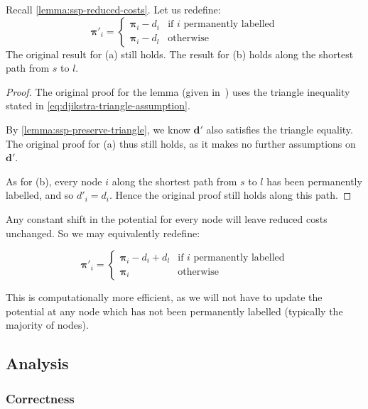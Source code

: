 \begin{lemma}
    Recall \cref{lemma:ssp-reduced-costs}. Let us redefine:
    {\normalfont
        \[\boldsymbol{\pi}'_{i}=\begin{cases}
        \boldsymbol{\pi}_{i}-d_{i} & \textrm{if $i$ permanently labelled}\\
        \boldsymbol{\pi}_{i}-d_{l} & \textrm{otherwise}
        \end{cases}\]}
    The original result for (a) still holds. The result for (b) holds along the shortest path from $s$ to $l$\footnotemark.
\end{lemma}
\begin{proof}
    The original proof for the lemma (given in~\cite[p.~320]{Ahuja:1993}) uses the triangle inequality stated in \cref{eq:djikstra-triangle-assumption}. 
    
    By \cref{lemma:ssp-preserve-triangle}, we know $\mathbf{d}'$ also satisfies the triangle equality. The original proof for (a) thus still holds, as it makes no further assumptions on $\mathbf{d}'$.
    
    As for (b), every node $i$ along the shortest path from $s$ to $l$ has been permanently labelled, and so $d'_i = d_i$. Hence the original proof still holds along this path.
\end{proof}

Any constant shift in the potential for every node will leave reduced costs unchanged. So we may equivalently redefine:

\[\boldsymbol{\pi}'_{i}=\begin{cases}
\boldsymbol{\pi}_{i}-d_i+d_l & \text{if $i$ permanently labelled}\\
\boldsymbol{\pi}_{i} & \text{otherwise}
\end{cases}\]

This is computationally more efficient, as we will not have to update the potential at any node which has not been permanently labelled (typically the majority of nodes).

\subsection{Analysis} \label{sec:impl-ssp-analysis}

\subsubsection{Correctness}

